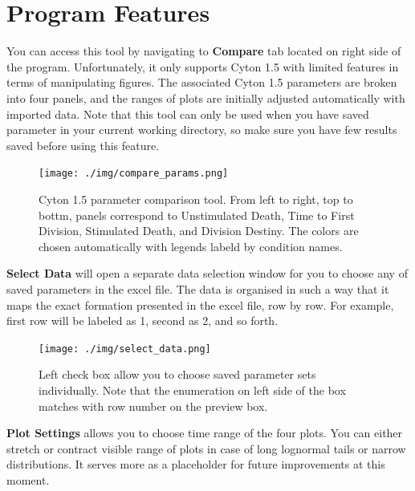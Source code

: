 \documentclass{article}
\newcommand{\enterProblemHeader}[1]{
    }
\newcommand{\exitProblemHeader}[1]{
    }
\newcounter{homeworkProblemCounter} %
\newcommand{\homeworkProblemName}{}
\newenvironment{homeworkProblem}[1][Problem \arabic{homeworkProblemCounter}]{ %
    \stepcounter{homeworkProblemCounter} %
    \renewcommand{\homeworkProblemName}{#1} %
    \section{\homeworkProblemName} %
    \enterProblemHeader{\homeworkProblemName} %
    }{
    \exitProblemHeader{\homeworkProblemName} %
    }
\begin{document}
\begin{homeworkProblem}[Program Features]
        You can access this tool by navigating to \textbf{Compare} tab located on right side of the program. Unfortunately, it only supports Cyton 1.5 with limited features in terms of manipulating figures. The associated Cyton 1.5 parameters are broken into four panels, and the ranges of plots are initially adjusted automatically with imported data. Note that this tool can only be used when you have saved parameter in your current working directory, so make sure you have few results saved before using this feature.

        \begin{figure}[h]
            \centering
            \texttt{[image: ./img/compare\_params.png]}
            \caption{Cyton 1.5 parameter comparison tool. From left to right, top to bottm, panels correspond to Unstimulated Death, Time to First Division, Stimulated Death, and Division Destiny. The colors are chosen automatically with legends labeld by condition names.}
            \label{fig:compare_params}
        \end{figure}

        \textbf{Select Data} will open a separate data selection window for you to choose any of saved parameters in the excel file. The data is organised in such a way that it maps the exact formation presented in the excel file, row by row. For example, first row will be labeled as 1, second as 2, and so forth.
        
        \begin{figure}[h]
            \centering
            \texttt{[image: ./img/select\_data.png]}
            \caption{Left check box allow you to choose saved parameter sets individually. Note that the enumeration on left side of the box matches with row number on the preview box.}
            \label{fig:select_data}
        \end{figure}

        \textbf{Plot Settings} allows you to choose time range of the four plots. You can either stretch or contract visible range of plots in case of long lognormal tails or narrow distributions. It serves more as a placeholder for future improvements at this moment.


\end{homeworkProblem}
\end{document}
